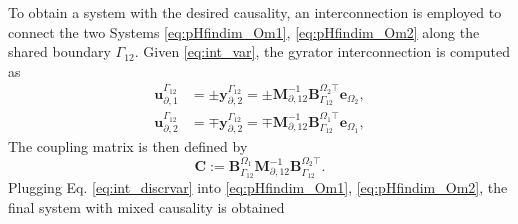 To obtain a system with the desired causality, an interconnection is employed to connect the two Systems \eqref{eq:pHfindim_Om1}, \eqref{eq:pHfindim_Om2} along the shared boundary $\Gamma_{12}$. Given \eqref{eq:int_var}, the gyrator interconnection is computed as
\begin{equation}\label{eq:int_discrvar}
\begin{aligned}
{\mathbf{u}_{\partial, 1}^{\Gamma_{12}}} &= \pm {\mathbf{y}_{\partial, 2}^{\Gamma_{12}}}= \pm \mathbf{M}_{\partial, 12}^{-1} \mathbf{B}_{\Gamma_{12}}^{\Omega_2 \top} \mathbf{e}_{\Omega_2}, \\ {\mathbf{u}_{\partial, 2}^{\Gamma_{12}}} &= \mp {\mathbf{y}_{\partial, 2}^{\Gamma_{12}}}=\mp \mathbf{M}_{\partial, 12}^{-1} \mathbf{B}_{\Gamma_{12}}^{\Omega_1 \top} \mathbf{e}_{\Omega_1}, 
\end{aligned}
\end{equation}
The coupling matrix is then defined by 
\begin{equation}
\mathbf{C} := \mathbf{B}_{\Gamma_{12}}^{\Omega_1}\mathbf{M}_{\partial, 12}^{-1} \mathbf{B}_{\Gamma_{12}}^{\Omega_2 \top}.	
\end{equation}
Plugging Eq. \eqref{eq:int_discrvar} into \ref{eq:pHfindim_Om1}, \ref{eq:pHfindim_Om2}, the final system with mixed causality is obtained

